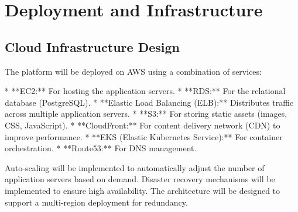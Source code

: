 \documentclass[11pt,a4paper,oneside]{article}
\begin{document}
\section{Deployment and Infrastructure}

\subsection{Cloud Infrastructure Design}

The platform will be deployed on AWS using a combination of services:

* **EC2:**  For hosting the application servers.
* **RDS:** For the relational database (PostgreSQL).
* **Elastic Load Balancing (ELB):**  Distributes traffic across multiple application servers.
* **S3:** For storing static assets (images, CSS, JavaScript).
* **CloudFront:**  For content delivery network (CDN) to improve performance.
* **EKS (Elastic Kubernetes Service):** For container orchestration.
* **Route53:** For DNS management.

Auto-scaling will be implemented to automatically adjust the number of application servers based on demand.  Disaster recovery mechanisms will be implemented to ensure high availability.  The architecture will be designed to support a multi-region deployment for redundancy.
\end{document}
